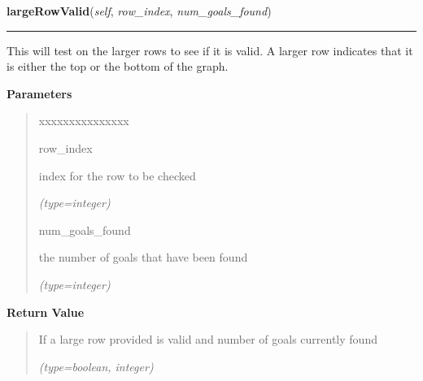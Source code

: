     \vspace{0.5ex}

\hspace{.8\funcindent}\begin{boxedminipage}{\funcwidth}

    \raggedright \textbf{largeRowValid}(\textit{self}, \textit{row\_index}, \textit{num\_goals\_found})

    \vspace{-1.5ex}

    \rule{\textwidth}{0.5\fboxrule}
\setlength{\parskip}{2ex}
    This will test on the larger rows to see if it is valid. A larger row 
    indicates that it is either the top or the bottom of the graph.

\setlength{\parskip}{1ex}
      \textbf{Parameters}
      \vspace{-1ex}

      \begin{quote}
        \begin{Ventry}{xxxxxxxxxxxxxxx}

          \item[row\_index]

          index for the row to be checked

            {\it (type=integer)}

          \item[num\_goals\_found]

          the number of goals that have been found

            {\it (type=integer)}

        \end{Ventry}

      \end{quote}

      \textbf{Return Value}
    \vspace{-1ex}

      \begin{quote}
      If a large row provided is valid and number of goals currently found

      {\it (type=boolean, integer)}

      \end{quote}

    \end{boxedminipage}

    \label{UnBlockMeSolver:Map:Map:Map:numColumnsMatch}

